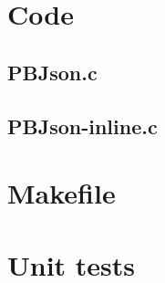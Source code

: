 \begin{scriptsize}
\begin{ttfamily}

\end{ttfamily}
\end{scriptsize}

\section{Code}

\subsection{PBJson.c}

\begin{scriptsize}
\begin{ttfamily}

\end{ttfamily}
\end{scriptsize}

\subsection{PBJson-inline.c}

\begin{scriptsize}
\begin{ttfamily}

\end{ttfamily}
\end{scriptsize}

\section{Makefile}

\begin{scriptsize}
\begin{ttfamily}

\end{ttfamily}
\end{scriptsize}

\section{Unit tests}

\begin{scriptsize}
\begin{ttfamily}

\end{ttfamily}
\end{scriptsize}

